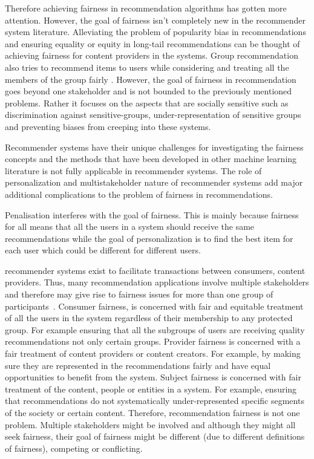 Therefore achieving fairness in recommendation algorithms has gotten more attention. However, the goal of fairness isn't completely new in the recommender system literature. Alleviating the problem of popularity bias in recommendations \cite{popbias2018} and ensuring equality or equity in long-tail recommendations \cite{ferraro2019} can be thought of achieving fairness for content providers in the systems. Group recommendation also tries to recommend items to users while considering and treating all the members of the group fairly \cite{kaya2020}. However, the goal of fairness in recommendation goes beyond one stakeholder and is not bounded to the previously mentioned problems. Rather it focuses on the aspects that are socially sensitive such as discrimination against sensitive-groups, under-representation of sensitive groups and preventing biases from creeping into these systems.

Recommender systems have their unique challenges for investigating the fairness concepts and the methods that have been developed in other machine learning literature is not fully applicable in recommender systems. The role of personalization and  multistakeholder nature of recommender systems add major additional complications to the problem of fairness in recommendations.
    
    Penalisation interferes with the goal of fairness. This is mainly because fairness for all means that all the users in a system should receive the same recommendations  while the goal of personalization is to find the best item for each user which could be different for different users.
    
    recommender systems exist to facilitate transactions between consumers, content providers. Thus, many recommendation applications involve multiple stakeholders and therefore may give rise to fairness issues for more than one group of participants~\cite{burke_multisided_2017}. Consumer fairness, is concerned with fair and equitable treatment of all the users in the system regardless of their membership to any protected group. For example ensuring that all the subgroups of users are receiving quality recommendations not only certain groups. Provider fairness is concerned with a fair treatment of content providers or content creators. For example, by making sure they are represented in the recommendations fairly and have equal opportunities to benefit from the system. Subject fairness is concerned with fair treatment of the content, people or entities in a system. For example, ensuring that recommendations do not systematically under-represented specific segments of the society or certain content.
    Therefore, recommendation fairness is not one problem. Multiple stakeholders might be involved and although they might all seek fairness, their goal of fairness might be different (due to different definitions of fairness), competing or conflicting.
    

